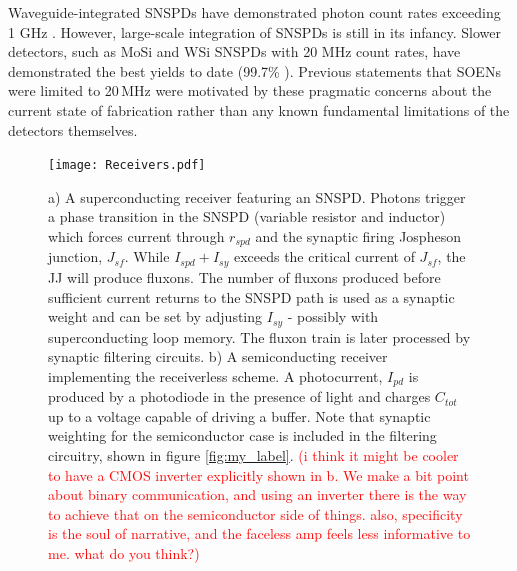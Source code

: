 \documentclass[twocolumn]{article}
\begin{document}
Waveguide-integrated SNSPDs have demonstrated photon count rates exceeding 1 GHz \cite{vetter2016cavity}. However, large-scale integration of SNSPDs is still in its infancy. Slower detectors, such as MoSi and WSi SNSPDs with 20 MHz count rates, have demonstrated the best yields to date (99.7\% \cite{Varun's array paper from 2020}). Previous statements that SOENs were limited to 20\,MHz were motivated by these pragmatic concerns about the current state of fabrication rather than any known fundamental limitations of the detectors themselves.

\begin{figure}
    \centering
    \texttt{[image: Receivers.pdf]}
    \caption{a) A superconducting receiver featuring an SNSPD. Photons trigger a phase transition in the SNSPD (variable resistor and inductor) which forces current through $r_{spd}$ and the synaptic firing Jospheson junction, $J_{sf}$. While $I_{spd} + I_{sy}$ exceeds the critical current of $J_{sf}$, the JJ will produce fluxons. The number of fluxons produced before sufficient current returns to the SNSPD path is used as a synaptic weight and can be set by adjusting $I_{sy}$ - possibly with superconducting loop memory. The fluxon train is later processed by synaptic filtering circuits. b) A semiconducting receiver implementing the receiverless scheme. A photocurrent, $I_{pd}$ is produced by a photodiode in the presence of light and charges $C_{tot}$ up to a voltage capable of driving a buffer. Note that synaptic weighting for the semiconductor case is included in the filtering circuitry, shown in figure \ref{fig:my_label}. \textcolor{red}{(i think it might be cooler to have a CMOS inverter explicitly shown in b. We make a bit point about binary communication, and using an inverter there is the way to achieve that on the semiconductor side of things. also, specificity is the soul of narrative, and the faceless amp feels less informative to me. what do you think?)}}
    \label{fig:sup_synapse}
\end{figure}
\end{document}
